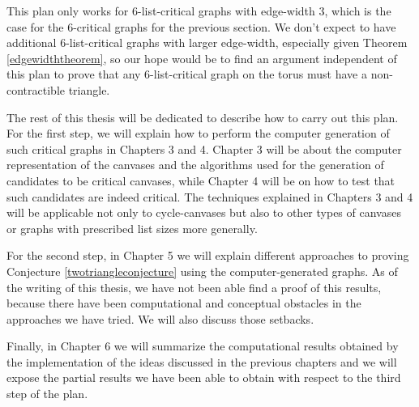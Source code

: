 This plan only works for $6$-list-critical graphs with edge-width $3$, which is the case for 
the $6$-critical graphs for the previous section. We don't expect to have additional 
$6$-list-critical graphs with larger edge-width, especially given Theorem \ref{edgewidththeorem}, so our
hope would be to find an argument independent of this plan to prove that any $6$-list-critical
graph on the torus must have a non-contractible triangle. 


The rest of this thesis will be dedicated to describe how to carry out this plan. 
For the first step, we will explain how to perform the computer generation of such critical graphs
in Chapters 3 and 4. Chapter 3 will be about the computer representation of the canvases 	
and the algorithms used for the generation of candidates to be critical canvases, while 
Chapter 4 will be on how to test that such candidates are indeed critical. The techniques 
explained in Chapters 3 and 4 will be applicable not only to cycle-canvases but also to other
types of canvases or graphs with prescribed list sizes more generally. 

For the second step, in Chapter 5 we will explain different approaches to proving Conjecture 
\ref{twotriangleconjecture} using the computer-generated graphs. As of the writing of this thesis,
we have not been able find a proof of this results, because there have been computational and
conceptual obstacles in the approaches we have tried. We will also discuss those setbacks.

Finally, in Chapter 6 we will summarize the computational results obtained by the implementation
of the ideas discussed in the previous chapters and we will expose the partial results we 
have been able to obtain with respect to the third step of the plan. 



 
